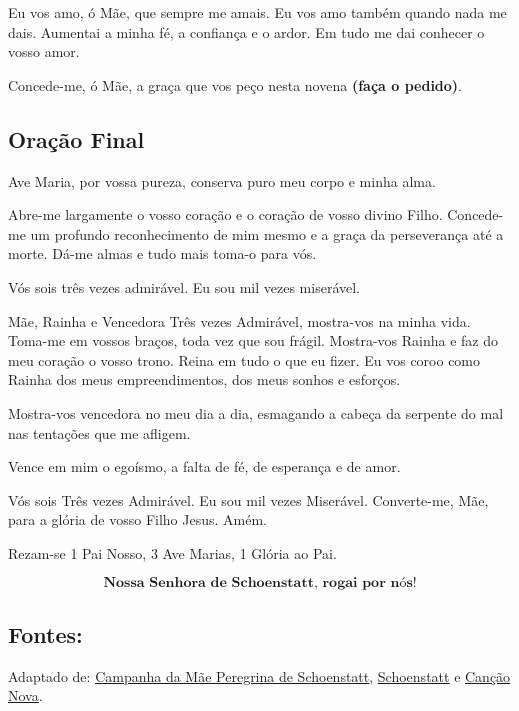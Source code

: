 \documentclass[a4paper,14pt]{extarticle} \usepackage[utf8]{inputenc}
\begin{document}
Eu vos amo, ó Mãe, que sempre me amais. Eu vos amo também quando nada me dais.
Aumentai a minha fé, a confiança e o ardor. Em tudo me dai conhecer o vosso amor.

Concede-me, ó Mãe, a graça que vos peço nesta novena \textbf{(faça o pedido)}.

\subsection{Oração Final} \label{oracao-final}

Ave Maria, por vossa pureza, conserva puro meu corpo e minha alma.

Abre-me largamente o vosso coração e o coração de vosso divino Filho. Concede-me um profundo reconhecimento de mim mesmo e a graça da perseverança até a morte. Dá-me almas e tudo mais toma-o para vós.

Vós sois três vezes admirável.
Eu sou mil vezes miserável.


Mãe, Rainha e Vencedora Três vezes Admirável, mostra-vos na minha vida.
Toma-me em vossos braços, toda vez que sou frágil.
Mostra-vos Rainha e faz do meu coração o vosso trono.
Reina em tudo o que eu fizer.
Eu vos coroo como Rainha dos meus empreendimentos, dos meus sonhos e esforços.

Mostra-vos vencedora no meu dia a dia, esmagando a cabeça da serpente do mal nas tentações que me afligem.

Vence em mim o egoísmo, a falta de fé, de esperança e de amor.

Vós sois Três vezes Admirável.
Eu sou mil vezes Miserável.
Converte-me, Mãe, para a glória de vosso Filho Jesus.
Amém.

\begin{center}
  Rezam-se 1 Pai Nosso, 3 Ave Marias, 1 Glória ao Pai.
\end{center}

\[
\textbf{Nossa Senhora de Schoenstatt, rogai por nós!}
\]

\vfill

\begin{center}
\subsection*{Fontes:}
Adaptado de: \underline{\href{https://www.maeperegrina.org.br/noticias/maria-mae-e-rainha-tres-vezes-admiravel-de-schoenstatt/}{Campanha da Mãe Peregrina de Schoenstatt}}, \underline{\href{https://www.schoenstatt.pt/sobre-schoenstatt/origem-e-historia-de-schoenstatt}{Schoenstatt}} e \underline{\href{https://formacao.cancaonova.com/espiritualidade/oracao/oracoes-a-nossa-senhora-de-schoenstatt/}{Canção Nova}}.
\end{center}
\end{document}
